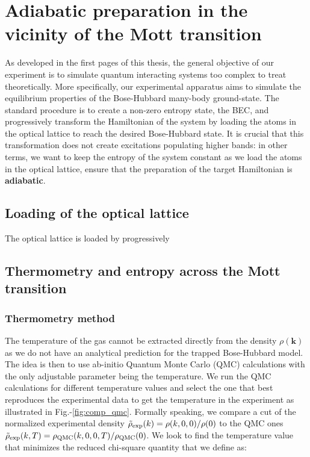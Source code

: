 \section{Adiabatic preparation in the vicinity of the Mott transition}

As developed in the first pages of this thesis, the general objective of our experiment is to simulate quantum interacting systems too complex to treat theoretically. More specifically, our experimental apparatus aims to simulate the equilibrium properties of the Bose-Hubbard many-body ground-state. The standard procedure is to create a non-zero entropy state, the BEC, and progressively transform the Hamiltonian of the system by loading the atoms in the optical lattice to reach the desired Bose-Hubbard state. It is crucial that this transformation does not create excitations populating higher bands: in other terms, we want to keep the entropy of the system constant as we load the atoms in the optical lattice, \ie ensure that the preparation of the target Hamiltonian is \textbf{adiabatic}. 


\subsection{Loading of the optical lattice}

The optical lattice is loaded by progressively 

\subsection{Thermometry and entropy across the Mott transition}

\subsubsection{Thermometry method}

The temperature of the gas cannot be extracted directly from the density $\rho(\bm{k})$ as we do not have an analytical prediction for the trapped Bose-Hubbard model. The idea is then to use ab-initio Quantum Monte Carlo (QMC) calculations with the only adjustable parameter being the temperature. We run the QMC calculations for different temperature values and select the one that best reproduces the experimental data to get the temperature in the experiment as illustrated in Fig.-\ref{fig:comp_qmc}. Formally speaking, we compare a cut of the normalized experimental density $\tilde{\rho}_{\rm{exp}}(k)=\rho(k,0,0)/\rho(0)$ to the QMC ones $\tilde{\rho}_{\rm{exp}}(k,T)=\rho_{\rm{QMC}}(k,0,0,T)/\rho_{\rm{QMC}}(0)$. We look to find the temperature value that minimizes the reduced chi-square quantity that we define as:

